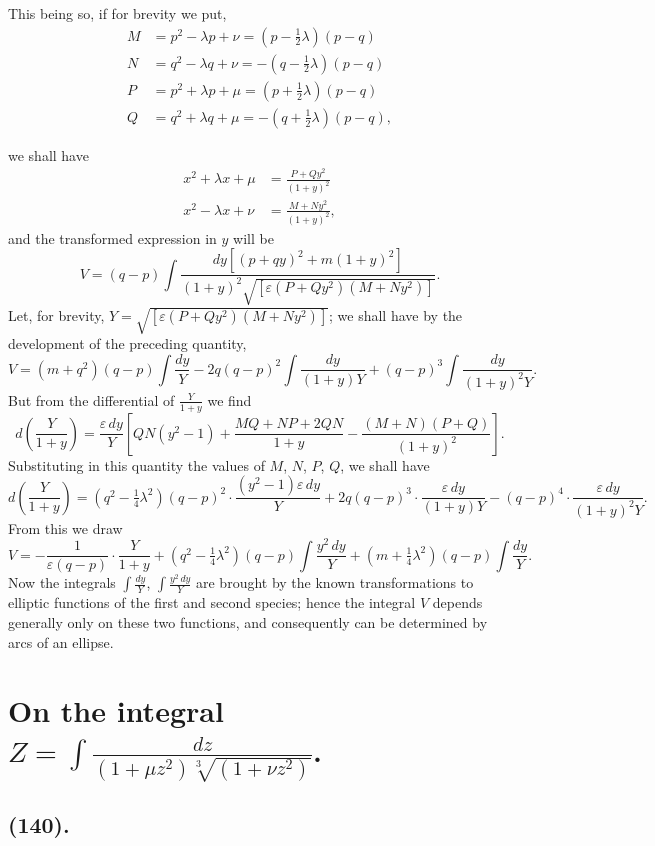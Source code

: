 \documentclass{article}
\begin{document}
This being so, if for brevity we put,
\[ \begin{aligned} M&=p^{2}-\lambda p+\nu=(p-\tfrac{1}{2}\lambda)(p-q)\\ N&=q^{2}-\lambda q+\nu=-(q-\tfrac{1}{2}\lambda)(p-q)\\ P&=p^{2}+\lambda p+\mu=(p+\tfrac{1}{2}\lambda)(p-q)\\ Q&=q^{2}+\lambda q+\mu=-(q+\tfrac{1}{2}\lambda)(p-q), \end{aligned} \]

we shall have
\[ \begin{aligned} x^{2}+\lambda x+\mu&=\frac{P+Qy^{2}}{(1+y)^{2}}\\ x^{2}-\lambda x+\nu&=\frac{M+Ny^{2}}{(1+y)^{2}}, \end{aligned} \]
and the transformed expression in $y$ will be
\[ V=(q-p)\int\frac{dy[(p+qy)^{2}+m(1+y)^{2}]}{(1+y)^{2}\sqrt{[\varepsilon(P+Qy^{2})(M+Ny^{2})]}}. \]
Let, for brevity, $Y=\sqrt{[\varepsilon(P+Qy^{2})(M+Ny^{2})]}$; we shall have by the development of the preceding quantity,
\[ V=(m+q^{2})(q-p)\int\frac{dy}{Y}-2q(q-p)^{2}\int\frac{dy}{(1+y)Y}+(q-p)^{3}\int\frac{dy}{(1+y)^{2}Y}. \]
But from the differential of $\frac{Y}{1+y}$ we find
\[ d\left(\frac{Y}{1+y}\right)=\frac{\varepsilon\,dy}{Y}\left[QN(y^{2}-1)+\frac{MQ+NP+2QN}{1+y}-\frac{(M+N)(P+Q)}{(1+y)^{2}}\right]. \]
Substituting in this quantity the values of $M$, $N$, $P$, $Q$, we shall have
\[ d\left(\frac{Y}{1+y}\right)=(q^{2}-\tfrac{1}{4}\lambda^{2})(q-p)^{2}\cdot\frac{(y^{2}-1)\varepsilon\,dy}{Y}+2q(q-p)^{3}\cdot\frac{\varepsilon\,dy}{(1+y)Y}-(q-p)^{4}\cdot\frac{\varepsilon\,dy}{(1+y)^{2}Y}. \]
From this we draw
\[ V=-\frac{1}{\varepsilon(q-p)}\cdot\frac{Y}{1+y}+(q^{2}-\tfrac{1}{4}\lambda^{2})(q-p)\int\frac{y^{2}\,dy}{Y}+(m+\tfrac{1}{4}\lambda^{2})(q-p)\int\frac{dy}{Y}. \]
Now the integrals $\displaystyle\int\frac{dy}{Y}$, $\displaystyle\int\frac{y^{2}\,dy}{Y}$ are brought by the known transformations to elliptic functions of the first and second species; hence the integral $V$ depends generally only on these two functions, and consequently can be determined by arcs of an ellipse.

\section*{On the integral $Z=\displaystyle\int\frac{dz}{(1+\mu z^{2})\sqrt[3]{(1+\nu z^{2})}}$.}

\subsection*{(140).}
\end{document}
